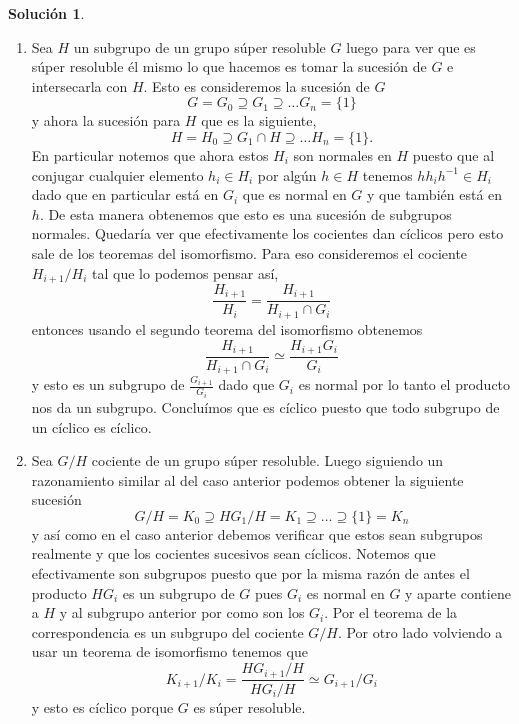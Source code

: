 \documentclass[11pt]{article}
\theoremstyle{plain}
\theoremstyle{definition}
\newtheorem*{sol}{Solución}
\theoremstyle{remark}
\begin{document}
\begin{sol}
	\begin{enumerate}
		\item Sea $H$ un subgrupo de un grupo súper resoluble $G$ luego para ver que es súper resoluble él mismo lo que hacemos es tomar la sucesión de $G$ e intersecarla con $H$. Esto es consideremos la sucesión de $G$
		\[
		G=G_0 \supseteq G_1 \supseteq \dots G_n = \{ 1 \}
		\]
		y ahora la sucesión para $H$ que es la siguiente,
		\[
		H=H_0 \supseteq G_1 \cap H \supseteq \dots H_n = \{ 1 \}.
		\]
		En particular notemos que ahora estos $H_i$ son normales en $H$ puesto que al conjugar cualquier elemento $h_i \in H_i$ por algún $h \in H$ tenemos $hh_ih^{-1} \in H_i$ dado que en particular está en $G_i$ que es normal en $G$ y que también está en $h$. De esta manera obtenemos que esto es una sucesión de subgrupos normales. Quedaría ver que efectivamente los cocientes dan cíclicos pero esto sale de los teoremas del isomorfismo. Para eso consideremos el cociente $H_{i+1}/H_i$ tal que lo podemos pensar así,
		\begin{equation*}
			\dfrac{H_{i+1}}{H_i} = \dfrac{H_{i+1}}{H_{i+1}\cap G_i} 
		\end{equation*}
		entonces usando el segundo teorema del isomorfismo obtenemos 
		\begin{equation*}
			\dfrac{H_{i+1}}{H_{i+1}\cap G_i} \simeq \dfrac{H_{i+1}G_i}{G_i} 
		\end{equation*}
		y esto es un subgrupo de $\frac{G_{i+1}}{G_i}$ dado que $G_i$ es normal por lo tanto el producto nos da un subgrupo. Concluímos que es cíclico puesto que todo subgrupo de un cíclico es cíclico.
		
		
		
		
		\item Sea $G/H$ cociente de un grupo súper resoluble. Luego siguiendo un razonamiento similar al del caso anterior podemos obtener la siguiente sucesión 
		\begin{equation*}
		G/H = K_0 \supseteq HG_1/H = K_1 \supseteq \dots \supseteq \{1\} = K_n
		\end{equation*}
		y así como en el caso anterior debemos verificar que estos sean subgrupos realmente y que los cocientes sucesivos sean cíclicos. Notemos que efectivamente son subgrupos puesto que por la misma razón de antes el producto $HG_i$ es un subgrupo de $G$ pues $G_i$ es normal en $G$ y aparte contiene a $H$ y al subgrupo anterior por como son los $G_i$. Por el teorema de la correspondencia es un subgrupo del cociente $G/H$. Por otro lado volviendo a usar un teorema de isomorfismo tenemos que
		\begin{equation*}
			K_{i+1}/K_i =  \dfrac{HG_{i+1}/H}{HG_i/H}  \simeq G_{i+1}/G_{i}
		\end{equation*}
		y esto es cíclico porque $G$ es súper resoluble.
	\end{enumerate}
\end{sol}
\end{document}
